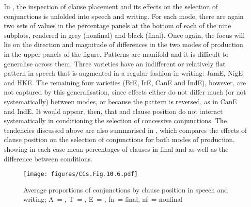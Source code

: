 In , the inspection of clause placement and its effects on the selection of conjunctions is unfolded into speech and writing. For each mode, there are again two sets of values in the percentage panels at the bottom of each of the nine subplots, rendered in grey (nonfinal) and black (final). Once again, the focus will lie on the direction and magnitude of differences in the two modes of production in the upper panels of the figure. Patterns are manifold and it is difficult to generalise across them. Three varieties have an indifferent or relatively flat pattern in speech that is augmented in a regular fashion in writing: JamE, NigE and HKE. The remaining four varieties (BrE, IrE, CanE and IndE), however, are not captured by this generalisation, since effects either do not differ much (or not systematically) between modes, or because the pattern is reversed, as in CanE and IndE. It would appear, then, that  and clause position do not interact systematically in conditioning the selection of concessive conjunctions. The tendencies discussed above are also summarised in , which compares the effects of clause position on the selection of conjunctions for both modes of production, showing in each case mean percentages of clauses in final and  as well as the difference between conditions.

\begin{figure}
\texttt{[image: figures/CCs.Fig.10.6.pdf]}
\caption{\label{bkm:Ref60209688}\label{fig:10.6}Average proportions of conjunctions by clause position in speech and writing; A~= , T~= , E~= , fn~= final, nf~= nonfinal}
\end{figure}

